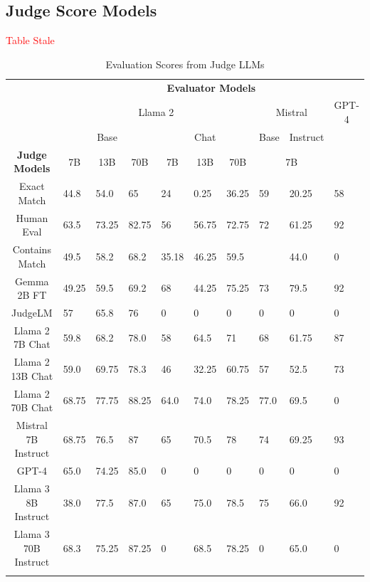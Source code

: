 \subsection{Judge Score Models}
\textcolor{red}{Table Stale}
{\small
\setlength{\tabcolsep}{4pt} %
\renewcommand{\arraystretch}{1.2} %
\begin{longtable}{|p{1.5cm}|p{1.1cm}|p{1.1cm}|p{1.1cm}|p{1.1cm}|p{1.1cm}|p{1.1cm}|p{1.1cm}|p{1.1cm}|p{1.1cm}|p{1.1cm}|}
\hline
\multicolumn{2}{|c|}{\multirow{2}{*}{}} & \multicolumn{9}{|c|}{\textbf{Evaluator Models}} \\ \cline{3-11}
\multicolumn{2}{|c|}{\multirow{2}{*}{}} & \multicolumn{6}{c|}{Llama 2} & \multicolumn{2}{c|}{Mistral} & \multicolumn{1}{c|}{GPT-4} \\ \cline{3-11}
\multicolumn{2}{|c|}{} & \multicolumn{3}{c|}{Base} & \multicolumn{3}{c|}{Chat} & \multicolumn{1}{c|}{Base} & \multicolumn{1}{c|}{Instruct} &  \\ \hline
\multicolumn{2}{|c|}{\textbf{Judge Models}} & \multicolumn{1}{c|}{7B} & \multicolumn{1}{c|}{13B} & \multicolumn{1}{c|}{70B} & \multicolumn{1}{c|}{7B} & \multicolumn{1}{c|}{13B} & \multicolumn{1}{c|}{70B} & \multicolumn{2}{c|}{7B} &\\ \hline
\multicolumn{2}{|c|}{Exact Match} & 44.8 & 54.0 & 65 & 24 & 0.25 & 36.25 & 59 & 20.25 & 58  \\ \hline
\multicolumn{2}{|c|}{Human Eval} & 63.5 & 73.25 & 82.75 & 56 & 56.75 & 72.75 & 72 & 61.25 & 92  \\  \hline
\multicolumn{2}{|c|}{Contains Match} & 49.5 & 58.2 & 68.2 & 35.18 & 46.25 & 59.5 &  & 44.0 & 0 \\ \hline
\multicolumn{2}{|c|}{Gemma 2B FT}  & 49.25 & 59.5 & 69.2 & 68 & 44.25 & 75.25 & 73 & 79.5 & 92 \\ \hline
\multicolumn{2}{|c|}{JudgeLM}  & 57 & 65.8 & 76 & 0 & 0 & 0 & 0 & 0 & 0 \\   \hline
\multicolumn{2}{|c|}{Llama 2 7B Chat}  & 59.8 & 68.2 & 78.0 & 58 & 64.5 & 71 & 68 & 61.75 & 87 \\   \hline
\multicolumn{2}{|c|}{Llama 2 13B Chat}  & 59.0 & 69.75 & 78.3 & 46 & 32.25 & 60.75 & 57 & 52.5 & 73  \\ \hline
\multicolumn{2}{|c|}{Llama 2 70B Chat}  & 68.75 & 77.75 & 88.25 & 64.0 & 74.0 & 78.25 & 77.0 & 69.5 & 0 \\ \hline
\multicolumn{2}{|c|}{Mistral 7B Instruct}  & 68.75 & 76.5 & 87 & 65 & 70.5 & 78 & 74 & 69.25 & 93  \\ \hline
\multicolumn{2}{|c|}{GPT-4} & 65.0 & 74.25 & 85.0 & 0 & 0 & 0 & 0 & 0 & 0 \\ \hline
\multicolumn{2}{|c|}{Llama 3 8B Instruct} & 38.0 & 77.5 & 87.0 & 65 & 75.0 & 78.5 & 75 & 66.0 & 92 \\ \hline
\multicolumn{2}{|c|}{Llama 3 70B Instruct} & 68.3 & 75.25 & 87.25 & 0 & 68.5 & 78.25 & 0 & 65.0 & 0 \\ \hline
\caption{Evaluation Scores from Judge LLMs} %
\label{tab:eval-scores} %
\end{longtable}
}

